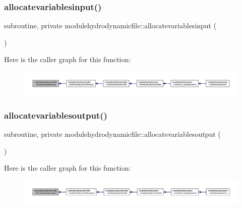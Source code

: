 \subsubsection{\texorpdfstring{allocatevariablesinput()}{allocatevariablesinput()}}
{\footnotesize\ttfamily subroutine, private modulehydrodynamicfile\+::allocatevariablesinput (\begin{DoxyParamCaption}{ }\end{DoxyParamCaption})\hspace{0.3cm}{\ttfamily [private]}}

Here is the caller graph for this function\+:\nopagebreak
\begin{figure}[H]
\begin{center}
\leavevmode
\includegraphics[width=350pt]{namespacemodulehydrodynamicfile_ac67e9023c973dadd99ed3b893b1cc9ad_icgraph}
\end{center}
\end{figure}
\mbox{\label{namespacemodulehydrodynamicfile_a395d8802270df14831dc0865064f36c1}} 
\subsubsection{\texorpdfstring{allocatevariablesoutput()}{allocatevariablesoutput()}}
{\footnotesize\ttfamily subroutine, private modulehydrodynamicfile\+::allocatevariablesoutput (\begin{DoxyParamCaption}{ }\end{DoxyParamCaption})\hspace{0.3cm}{\ttfamily [private]}}

Here is the caller graph for this function\+:\nopagebreak
\begin{figure}[H]
\begin{center}
\leavevmode
\includegraphics[width=350pt]{namespacemodulehydrodynamicfile_a395d8802270df14831dc0865064f36c1_icgraph}
\end{center}
\end{figure}
\mbox{\label{namespacemodulehydrodynamicfile_a66415f6a8626e085fe6327e56b6e0438}} 

